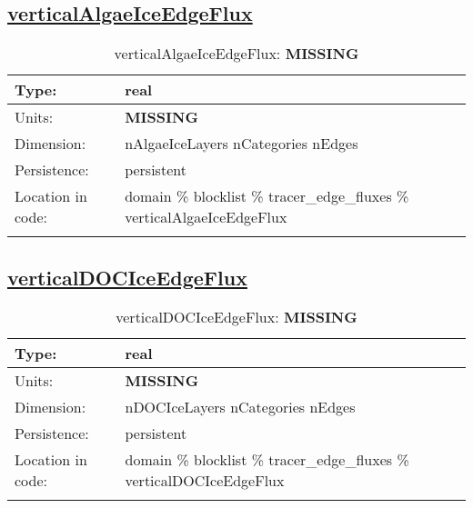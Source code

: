\subsection[verticalAlgaeIceEdgeFlux]{\hyperref[sec:var_tab_tracer_edge_fluxes]{verticalAlgaeIceEdgeFlux}}
\label{subsec:var_sec_tracer_edge_fluxes_verticalAlgaeIceEdgeFlux}
\begin{center}
\begin{longtable}{| p{2.0in} | p{4.0in} |}
        \hline 
        Type: & real \\
        \hline 
        Units: & {\bf \color{red} MISSING} \\
        \hline 
        Dimension: & nAlgaeIceLayers nCategories nEdges \\
        \hline 
        Persistence: & persistent \\
        \hline 
         Location in code: & domain \% blocklist \% tracer\_edge\_fluxes \% verticalAlgaeIceEdgeFlux \\
         \hline 
    \caption{verticalAlgaeIceEdgeFlux: {\bf \color{red} MISSING}}
\end{longtable}
\end{center}
\subsection[verticalDOCIceEdgeFlux]{\hyperref[sec:var_tab_tracer_edge_fluxes]{verticalDOCIceEdgeFlux}}
\label{subsec:var_sec_tracer_edge_fluxes_verticalDOCIceEdgeFlux}
\begin{center}
\begin{longtable}{| p{2.0in} | p{4.0in} |}
        \hline 
        Type: & real \\
        \hline 
        Units: & {\bf \color{red} MISSING} \\
        \hline 
        Dimension: & nDOCIceLayers nCategories nEdges \\
        \hline 
        Persistence: & persistent \\
        \hline 
         Location in code: & domain \% blocklist \% tracer\_edge\_fluxes \% verticalDOCIceEdgeFlux \\
         \hline 
    \caption{verticalDOCIceEdgeFlux: {\bf \color{red} MISSING}}
\end{longtable}
\end{center}
